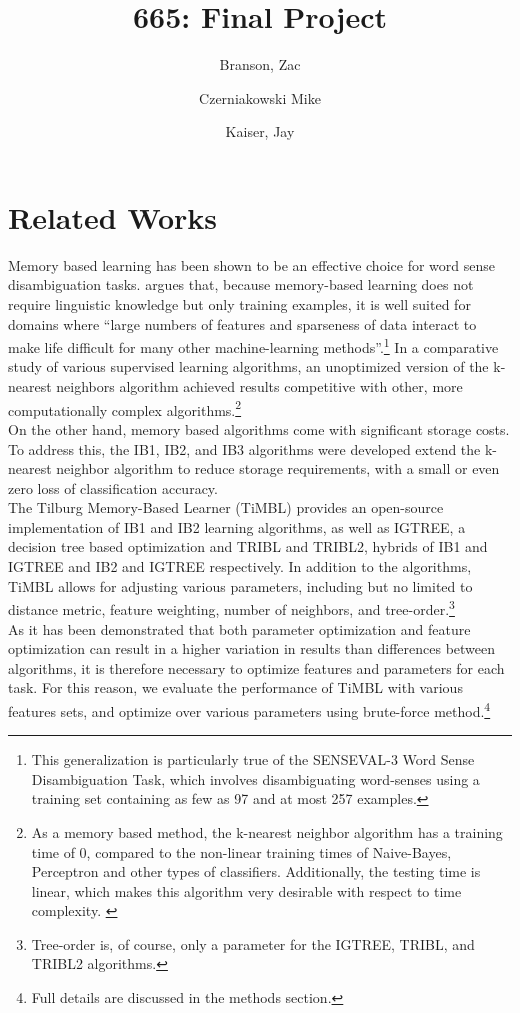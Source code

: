 \documentclass{article}
\title{665: Final Project}
\author{Branson, Zac
\and Czerniakowski Mike
\and Kaiser, Jay}
\begin{document}
\section{Related Works}
Memory based learning has been shown to be an effective choice for word sense disambiguation tasks.\cite{mooney1996comparative}   argues that, because memory-based learning does not require linguistic knowledge but only training examples, it is well suited for domains where “large numbers of features and sparseness of data interact to make life difficult for many other machine-learning methods”.\footnote{This generalization is particularly true of the SENSEVAL-3 Word Sense Disambiguation Task, which involves disambiguating word-senses using a training set containing as few as 97 and at most 257 examples.}  In a comparative study of various supervised learning algorithms, an unoptimized version of the k-nearest neighbors algorithm achieved results competitive with other, more computationally complex algorithms.\cite{mooney1996comparative}\footnote{As a memory based method, the k-nearest neighbor algorithm has a training time of 0, compared to the non-linear training times of Naive-Bayes, Perceptron and other types of classifiers.  Additionally, the testing time is linear, which makes this algorithm very desirable with respect to time complexity. \cite{mooney1996comparative}}  \\

On the other hand, memory based algorithms come with significant storage costs.  To address this, the IB1, IB2, and IB3 algorithms were developed extend the k-nearest neighbor algorithm to reduce storage requirements, with a small or even zero loss of classification accuracy. \cite{aha1991instance}\\   

The Tilburg Memory-Based Learner (TiMBL) provides an open-source implementation of IB1 and IB2 learning algorithms, as well as IGTREE, a decision tree based optimization and TRIBL and TRIBL2, hybrids of IB1 and IGTREE and IB2 and IGTREE respectively. \cite{daelemans2004timbl}  In addition to the algorithms, TiMBL allows for adjusting various parameters, including but no limited to distance metric, feature weighting, number of neighbors, and tree-order.\footnote{Tree-order is, of course, only a parameter for the IGTREE, TRIBL, and TRIBL2 algorithms.}\\
 
As it has been demonstrated that both parameter optimization \cite{daelemans2002evaluation} and feature optimization \cite{daelemans2003combined} can result in a higher variation in results than differences between algorithms, it is therefore necessary to optimize features and parameters for each task.  For this reason, we evaluate the performance of TiMBL with various features sets, and optimize over various parameters using brute-force method.\footnote{Full details are discussed in the methods section.}\\
\end{document}

